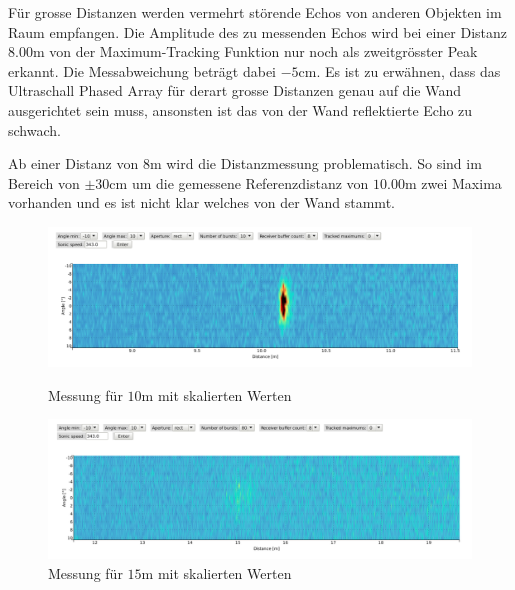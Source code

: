 Für grosse Distanzen werden vermehrt störende Echos von anderen Objekten im Raum empfangen. Die Amplitude des zu messenden Echos wird bei einer Distanz $8.00 \mathrm{m}$ von der Maximum-Tracking Funktion nur noch als zweitgrösster Peak erkannt. Die Messabweichung beträgt dabei $-5 \mathrm{cm}$. Es ist zu erwähnen, dass das Ultraschall Phased Array für derart grosse Distanzen genau auf die Wand ausgerichtet sein muss, ansonsten ist das von der Wand reflektierte Echo zu schwach.

Ab einer Distanz von $8 \mathrm{m}$ wird die Distanzmessung problematisch. So sind im Bereich von $\pm 30 \mathrm{cm}$ um die gemessene Referenzdistanz von {$10.00 \mathrm{m}$} zwei Maxima vorhanden und es ist nicht klar welches von der Wand stammt.

\clearpage
\begin{figure}[htb]
\begin{minipage}{1.0\textwidth}
\includegraphics[width=\textwidth]{graphics/image_test_distance_10m_scaled.png}
\caption{Messung für $10 \mathrm{m}$ mit skalierten Werten} %
\label{fig:image_test_distance_10m_scaled}
%
\end{minipage}
\begin{minipage}{1.0\textwidth}
\includegraphics[width=\textwidth]{graphics/image_test_distance_15m_scaled.png}
\caption{Messung für $15 \mathrm{m}$ mit skalierten Werten} %
\label{fig:image_test_distance_15m_scaled}
%
\end{minipage}
\end{figure}

